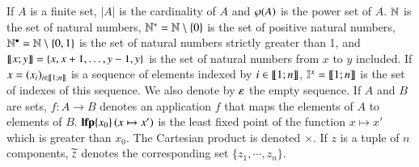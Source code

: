 If $A$ is a finite set,
$|A|$ is the cardinality of $A$
and $\wp(A)$ is the power set of $A$.
$\mathbb{N}$ is the set of natural numbers,
$\mathbb{N}^* = \mathbb{N} \setminus \{ 0 \}$ is the set of positive natural numbers,
$\mathbb{N}^\bullet = \mathbb{N} \setminus \{ 0, 1 \}$ is the set of natural numbers strictly greater than 1,
and $\llbracket x; y \rrbracket = \{ x, x+1, \dots, y-1, y \}$ is the set of natural numbers from $x$ to $y$ included.
If $x = (x_i)_{i \in \llbracket 1; n \rrbracket}$ is a sequence of elements indexed by $i \in \llbracket 1; n \rrbracket$,
$\mathbb{I}^{x} = \llbracket 1; n \rrbracket$ is the set of indexes of this sequence.
We also denote by $\varepsilon$ the empty sequence.
If $A$ and $B$ are sets,
$f : A \rightarrow B$ denotes an application $f$ that maps the elements of $A$ to elements of $B$.
$\mathbf{lfp}\{x_0\}\left(x\mapsto x'\right)$ is the least fixed point of the function $x \mapsto x'$ which is greater than $x_0$.
The Cartesian product is denoted $\times$.
If $z$ is a tuple of $n$ components, $\widetilde{z}$ denotes the corresponding set
	$\{z_1, \cdots, z_n\}$.
